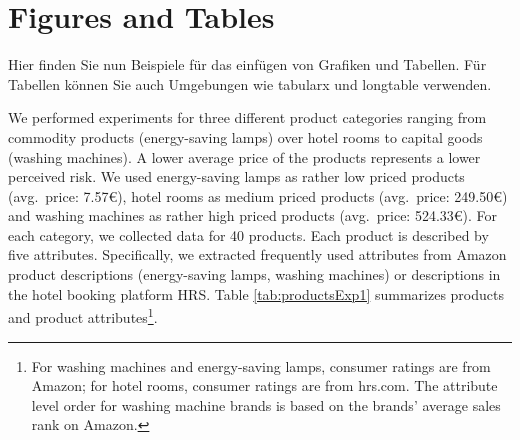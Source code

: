 \section{Figures and Tables} \label{sec:figuresTables}

Hier finden Sie nun Beispiele für das einfügen von Grafiken und Tabellen. Für Tabellen können Sie auch Umgebungen wie tabularx und longtable verwenden.

We performed experiments for three different product categories ranging from commodity products (energy-saving lamps) over hotel rooms to capital goods (washing machines). A lower average price of the products represents a lower perceived risk. We used energy-saving lamps as rather low priced products (avg.\ price: 7.57\euro), hotel rooms as medium priced products (avg.\ price: 249.50\euro) and washing machines as rather high priced products (avg.\ price: 524.33\euro). For each category, we collected data for 40 products. Each product is described by five attributes. Specifically, we extracted frequently used attributes from Amazon product descriptions (energy-saving lamps, washing machines) or descriptions in the hotel booking platform HRS. Table \ref{tab:productsExp1} summarizes products and product attributes\footnote{For washing machines and energy-saving lamps, consumer ratings are from Amazon; for hotel rooms, consumer ratings are from hrs.com. The attribute level order for washing machine brands is based on the brands' average sales rank on Amazon.}.

